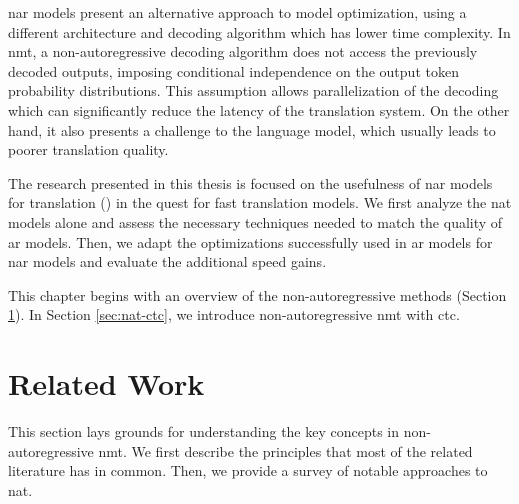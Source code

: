 \Gls{nar} models present an alternative approach to model optimization, using a
different architecture and decoding algorithm which has lower time complexity.
In \gls{nmt}, a non-autoregressive decoding algorithm does not access the
previously decoded outputs, imposing conditional independence on the output
token probability distributions. This assumption allows parallelization of the
decoding which can significantly reduce the latency of the translation
system. On the other hand, it also presents a challenge to the language model,
which usually leads to poorer translation quality.

The research presented in this thesis is focused on the usefulness of \gls{nar}
models for translation () in the quest for
fast translation models. We first analyze the \gls{nat} models alone and assess
the necessary techniques needed to match the quality of \gls{ar} models.  Then,
we adapt the optimizations successfully used in \gls{ar} models for \gls{nar}
models and evaluate the additional speed gains.

This chapter begins with an overview of the non-autoregressive methods (Section
\ref{sec:nat-methods}). In Section \ref{sec:nat-ctc}, we introduce
non-autoregressive \gls{nmt} with \gls{ctc}. 


\section{Related Work}
\label{sec:nat-methods}

This section lays grounds for understanding the key concepts in
non-autoregressive \gls{nmt}. We first describe the principles that most of the
related literature has in common. Then, we provide a survey of notable
approaches to \gls{nat}.

